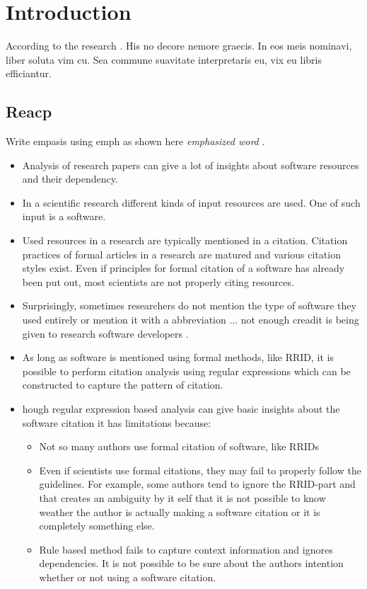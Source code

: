 \chapter{Introduction}
\label{ch:intro}
According to the research \citep{dueck:trio}. His no decore nemore graecis. In eos meis nominavi, liber soluta vim cu. Sea commune suavitate interpretaris eu, vix eu libris efficiantur.

%
%
\section{Reacp}
\label{sec:intro:reacp}
{}
Write empasis using emph as shown here \emph{emphasized word} .


\begin{itemize}
    \item Analysis of research papers can give a lot of insights about software resources and their dependency. 
    \item In a scientific research different kinds of input resources are used. One of such input is a software. 
    \item Used resources in a research are typically mentioned in a citation. Citation practices of formal articles in a research are matured and various citation styles exist. Even if principles  for formal citation of a software has already been put out, most scientists are not properly citing resources.  
	\item Surprisingly, sometimes researchers do not mention the type of software they used entirely or mention it with a abbreviation ... not enough creadit is being given to research software developers .
	\item As long as software is mentioned using formal methods, like RRID, it is possible to perform citation analysis using regular expressions which can be constructed to capture the pattern of citation.
	\item hough regular expression based analysis can give basic insights about the software citation it has limitations because:
			
			\begin{itemize}
				\item Not so many authors use formal citation of software, like RRIDs
				\item Even if scientists use formal citations, they may fail to properly follow the guidelines. For example, some authors tend to ignore the RRID-part and that creates an ambiguity by it self that it is not possible to know weather the author is actually making a software citation or it is completely something else. 
				\item Rule based method fails to capture context information and ignores dependencies. It is not possible to be sure about the authors intention whether or not using a software citation. 


\end{itemize}
\end{itemize}
